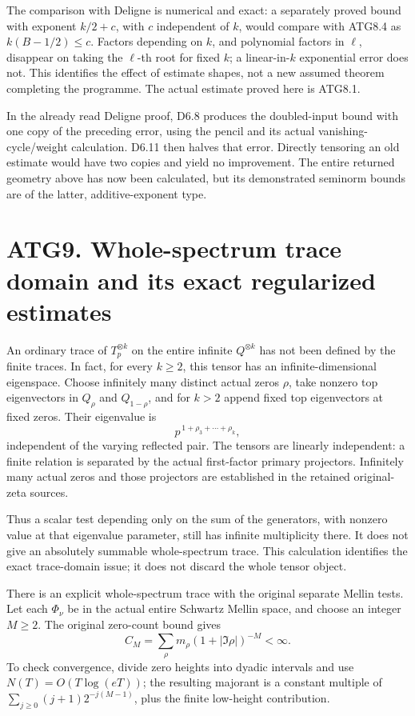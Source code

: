 The comparison with Deligne is numerical and exact: a separately proved
bound with exponent \(k/2+c\), with \(c\) independent of \(k\), would
compare with ATG8.4 as \(k(B-1/2)\le c\). Factors depending on \(k\),
and polynomial factors in \(\ell\), disappear on taking the \(\ell\)-th
root for fixed \(k\); a linear-in-\(k\) exponential error does not. This
identifies the effect of estimate shapes, not a new assumed theorem
completing the programme. The actual estimate proved here is ATG8.1.

In the already read Deligne proof, D6.8 produces the doubled-input bound
with one copy of the preceding error, using the pencil and its actual
vanishing-cycle/weight calculation. D6.11 then halves that error.
Directly tensoring an old estimate would have two copies and yield no
improvement. The entire returned geometry above has now been calculated,
but its demonstrated seminorm bounds are of the latter,
additive-exponent type.

\section{ATG9. Whole-spectrum trace domain and its exact regularized
estimates}\label{atg9.-whole-spectrum-trace-domain-and-its-exact-regularized-estimates}

An ordinary trace of \(T_p^{\otimes k}\) on the entire infinite
\(Q^{\otimes k}\) has not been defined by the finite traces. In fact,
for every \(k\ge2\), this tensor has an infinite-dimensional eigenspace.
Choose infinitely many distinct actual zeros \(\rho\), take nonzero top
eigenvectors in \(Q_\rho\) and \(Q_{1-\rho}\), and for \(k>2\) append
fixed top eigenvectors at fixed zeros. Their eigenvalue is \[
p^{\,1+\rho_3+\cdots+\rho_k},
\] independent of the varying reflected pair. The tensors are linearly
independent: a finite relation is separated by the actual first-factor
primary projectors. Infinitely many actual zeros and those projectors
are established in the retained original-zeta sources.

Thus a scalar test depending only on the sum of the generators, with
nonzero value at that eigenvalue parameter, still has infinite
multiplicity there. It does not give an absolutely summable
whole-spectrum trace. This calculation identifies the exact trace-domain
issue; it does not discard the whole tensor object.

There is an explicit whole-spectrum trace with the original separate
Mellin tests. Let each \(\Phi_\nu\) be in the actual entire Schwartz
Mellin space, and choose an integer \(M\ge2\). The original zero-count
bound gives \[
C_M=\sum_{\rho}m_\rho(1+|\Im\rho|)^{-M}<\infty.
\] To check convergence, divide zero heights into dyadic intervals and
use \(N(T)=O(T\log(eT))\); the resulting majorant is a constant multiple
of \(\sum_{j\ge0}(j+1)2^{-j(M-1)}\), plus the finite low-height
contribution.


